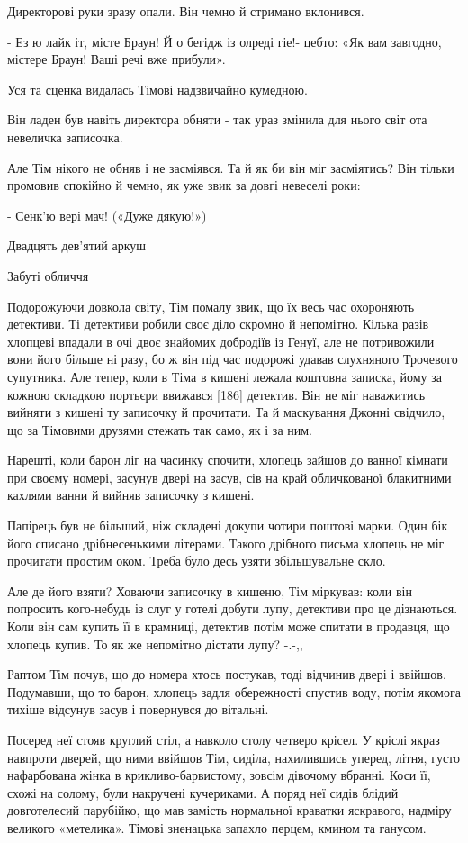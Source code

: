 Директорові руки зразу опали. Він чемно й стримано вклонився.

- Ез ю лайк іт, місте Браун! Й о бегідж із олреді гіе!- цебто: «Як вам завгодно, містере Браун! Ваші речі вже прибули».

Уся та сценка видалась Тімові надзвичайно кумедною.

Він ладен був навіть директора обняти - так ураз змінила для нього світ ота невеличка записочка.

Але Тім нікого не обняв і не засміявся. Та й як би він міг засміятись? Він тільки промовив спокійно й чемно, як уже звик за довгі невеселі роки:

- Сенк'ю вері мач! («Дуже дякую!»)

Двадцять дев'ятий аркуш

Забуті обличчя

Подорожуючи довкола світу, Тім помалу звик, що їх весь час охороняють детективи. Ті детективи робили своє діло скромно й непомітно. Кілька разів хлопцеві впадали в очі двоє знайомих добродіїв із Генуї, але не потривожили вони його більше ні разу, бо ж він під час подорожі удавав слухняного Трочевого супутника. Але тепер, коли в Тіма в кишені лежала коштовна записка, йому за кожною складкою портьєри ввижався [186] детектив. Він не міг наважитись вийняти з кишені ту записочку й прочитати. Та й маскування Джонні свідчило, що за Тімовими друзями стежать так само, як і за ним.

Нарешті, коли барон ліг на часинку спочити, хлопець зайшов до ванної кімнати при своєму номері, засунув двері на засув, сів на край обличкованої блакитними кахлями ванни й вийняв записочку з кишені.

Папірець був не більший, ніж складені докупи чотири поштові марки. Один бік його списано дрібнесенькими літерами. Такого дрібного письма хлопець не міг прочитати простим оком. Треба було десь узяти збільшувальне скло.

Але де його взяти? Ховаючи записочку в кишеню, Тім міркував: коли він попросить кого-небудь із слуг у готелі добути лупу, детективи про це дізнаються. Коли він сам купить її в крамниці, детектив потім може спитати в продавця, що хлопець купив. То як же непомітно дістати лупу? -.-,,

Раптом Тім почув, що до номера хтось постукав, тоді відчинив двері і ввійшов. Подумавши, що то барон, хлопець задля обережності спустив воду, потім якомога тихіше відсунув засув і повернувся до вітальні.

Посеред неї стояв круглий стіл, а навколо столу четверо крісел. У кріслі якраз навпроти дверей, що ними ввійшов Тім, сиділа, нахилившись уперед, літня, густо нафарбована жінка в крикливо-барвистому, зовсім дівочому вбранні. Коси її, схожі на солому, були накручені кучериками. А поряд неї сидів блідий довготелесий парубійко, що мав замість нормальної краватки яскравого, надміру великого «метелика». Тімові зненацька запахло перцем, кмином та ганусом.

